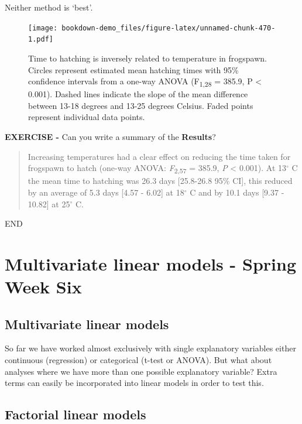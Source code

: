\documentclass[
]{book}
\begin{document}
Neither method is `best'.

\begin{figure}
\centering
\texttt{[image: bookdown-demo\_files/figure-latex/unnamed-chunk-470-1.pdf]}
\caption{\label{fig:unnamed-chunk-470}Time to hatching is inversely related to temperature in frogspawn. Circles represent estimated mean hatching times with 95\% confidence intervals from a one-way ANOVA (F\textsubscript{1,28} = 385.9, P \textless{} 0.001). Dashed lines indicate the slope of the mean difference between 13-18 degrees and 13-25 degrees Celsius. Faded points represent individual data points.}
\end{figure}

\textbf{EXERCISE -} Can you write a summary of the \textbf{Results}?

\begin{quote}
Increasing temperatures had a clear effect on reducing the time taken for frogspawn to hatch (one-way ANOVA: \emph{F}\textsubscript{2,57} = 385.9, \emph{P} \textless{} 0.001). At 13\(^\circ\) C the mean time to hatching was 26.3 days {[}25.8-26.8 95\% CI{]}, this reduced by an average of 5.3 days {[}4.57 - 6.02{]} at 18\(^\circ\) C and by 10.1 days {[}9.37 - 10.82{]} at 25\(^\circ\) C.
\end{quote}

END

\hypertarget{multivariate-linear-models---spring-week-six}{%
\chapter{Multivariate linear models - Spring Week Six}\label{multivariate-linear-models---spring-week-six}}

\hypertarget{multivariate-linear-models}{%
\section{Multivariate linear models}\label{multivariate-linear-models}}

So far we have worked almost exclusively with single explanatory variables either continuous (regression) or categorical (t-test or ANOVA). But what about analyses where we have more than one possible explanatory variable? Extra terms can easily be incorporated into linear models in order to test this.

\hypertarget{factorial-linear-models}{%
\section{Factorial linear models}\label{factorial-linear-models}}
\end{document}
